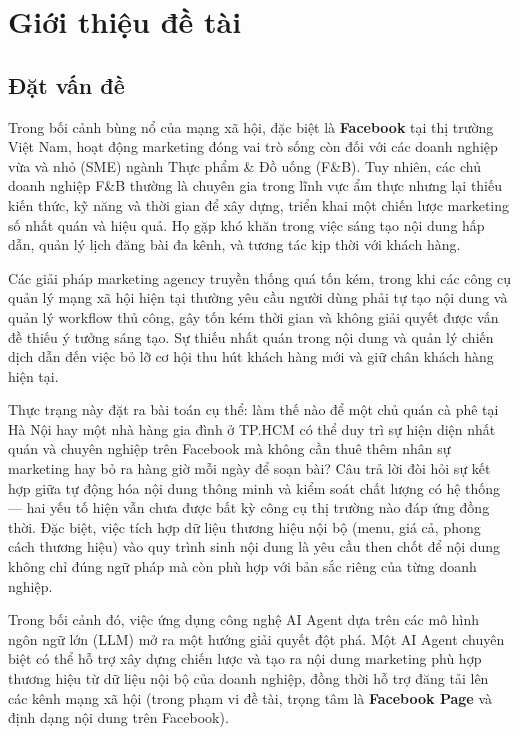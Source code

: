 \chapter{Giới thiệu đề tài}\label{chap:gioi-thieu}

\section{Đặt vấn đề}\label{sec:dat-van-de}

Trong bối cảnh bùng nổ của mạng xã hội, đặc biệt là \textbf{Facebook} tại
thị trường Việt Nam, hoạt động marketing đóng vai trò sống còn đối với
các doanh nghiệp vừa và nhỏ (SME) ngành Thực phẩm \& Đồ uống (F\&B).
Tuy nhiên, các chủ doanh nghiệp F\&B thường là chuyên gia trong lĩnh vực
ẩm thực nhưng lại thiếu kiến thức, kỹ năng và thời gian để xây dựng,
triển khai một chiến lược marketing số nhất quán và hiệu quả. Họ gặp khó
khăn trong việc sáng tạo nội dung hấp dẫn, quản lý lịch đăng bài đa
kênh, và tương tác kịp thời với khách hàng.

Các giải pháp marketing agency truyền thống quá tốn kém, trong khi các
công cụ quản lý mạng xã hội hiện tại thường yêu cầu người dùng phải tự
tạo nội dung và quản lý workflow thủ công, gây tốn kém thời gian và
không giải quyết được vấn đề thiếu ý tưởng sáng tạo. Sự thiếu nhất quán
trong nội dung và quản lý chiến dịch dẫn đến việc bỏ lỡ cơ hội thu hút
khách hàng mới và giữ chân khách hàng hiện tại.

Thực trạng này đặt ra bài toán cụ thể: làm thế nào để một chủ quán cà
phê tại Hà Nội hay một nhà hàng gia đình ở TP.HCM có thể duy trì sự
hiện diện nhất quán và chuyên nghiệp trên Facebook mà không cần thuê
thêm nhân sự marketing hay bỏ ra hàng giờ mỗi ngày để soạn bài? Câu
trả lời đòi hỏi sự kết hợp giữa tự động hóa nội dung thông minh và
kiểm soát chất lượng có hệ thống --- hai yếu tố hiện vẫn chưa được bất
kỳ công cụ thị trường nào đáp ứng đồng thời. Đặc biệt, việc tích hợp
dữ liệu thương hiệu nội bộ (menu, giá cả, phong cách thương hiệu) vào
quy trình sinh nội dung là yêu cầu then chốt để nội dung không chỉ
đúng ngữ pháp mà còn phù hợp với bản sắc riêng của từng doanh nghiệp.

Trong bối cảnh đó, việc ứng dụng công nghệ AI Agent dựa trên các mô hình
ngôn ngữ lớn (LLM) mở ra một hướng giải quyết đột phá. Một AI Agent
chuyên biệt có thể hỗ trợ xây dựng chiến lược và tạo ra nội dung
marketing phù hợp thương hiệu từ dữ liệu nội bộ của doanh nghiệp, đồng
thời hỗ trợ đăng tải lên các kênh mạng xã hội (trong phạm vi đề tài,
trọng tâm là \textbf{Facebook Page} và định dạng nội dung trên Facebook).


